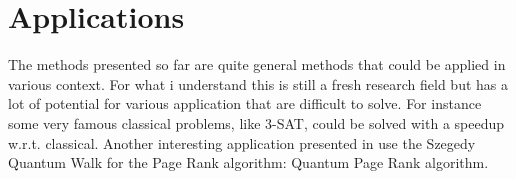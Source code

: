 \section{Applications}

The methods presented so far are quite general methods that could be applied in various context. For what i understand this is still a fresh research field 
but has a lot of potential for various application that are difficult to solve. For instance some very famous classical problems, like 3-SAT, 
could be solved with a speedup w.r.t. classical. Another interesting application presented in \cite{Loke_2017} use the Szegedy Quantum Walk
for the Page Rank algorithm: Quantum Page Rank algorithm.

